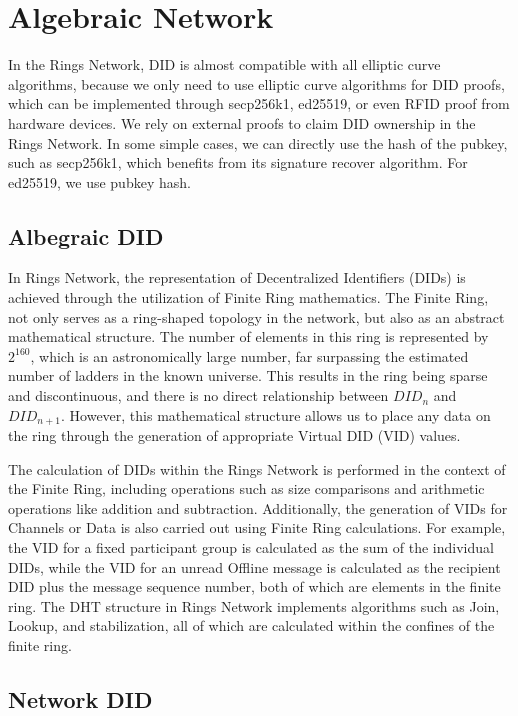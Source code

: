 \documentclass[twocolumn]{article}
\begin{document}
\section{Algebraic Network}

In the Rings Network, DID is almost compatible with all elliptic curve algorithms, because we only need to use elliptic curve algorithms for DID proofs, which can be implemented through secp256k1, ed25519, or even RFID proof from hardware devices. We rely on external proofs to claim DID ownership in the Rings Network. In some simple cases, we can directly use the hash of the pubkey, such as secp256k1, which benefits from its signature recover algorithm. For ed25519, we use pubkey hash.

\subsection{Albegraic DID}

In Rings Network, the representation of Decentralized Identifiers (DIDs) is achieved through the utilization of Finite Ring mathematics. The Finite Ring, not only serves as a ring-shaped topology in the network, but also as an abstract mathematical structure. The number of elements in this ring is represented by $2^{160}$, which is an astronomically large number, far surpassing the estimated number of ladders in the known universe. This results in the ring being sparse and discontinuous, and there is no direct relationship between $DID_n$ and $DID_{n+1}$. However, this mathematical structure allows us to place any data on the ring through the generation of appropriate Virtual DID (VID) values.

The calculation of DIDs within the Rings Network is performed in the context of the Finite Ring, including operations such as size comparisons and arithmetic operations like addition and subtraction. Additionally, the generation of VIDs for Channels or Data is also carried out using Finite Ring calculations. For example, the VID for a fixed participant group is calculated as the sum of the individual DIDs, while the VID for an unread Offline message is calculated as the recipient DID plus the message sequence number, both of which are elements in the finite ring. The DHT structure in Rings Network implements algorithms such as Join, Lookup, and stabilization, all of which are calculated within the confines of the finite ring.

\subsection{Network DID}
\end{document}
